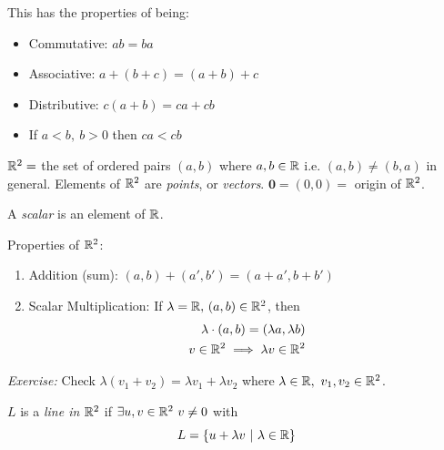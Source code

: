 \documentclass[10pt]{scrartcl}
\begin{document}
 
 
  This has the properties of being:\begin{itemize}
\item Commutative: $ab = ba$
\item Associative: $a+(b+c) = (a+b) + c	$
\item Distributive: $c(a+b) = ca + cb$
\item If $a<b,~b>0$ then $ca < cb$
\end{itemize}\vspace*{10pt}

\begin{definition}$\mathbb{R}^2 = $ the set of ordered pairs $(a,b)$ where $a,b \in \mathbb{R}$ i.e. $(a,b) \neq (b,a)$ in general. Elements of $\mathbb{R}^2$ are \emph{points}, or \emph{vectors}. $\mathbf{0} = (0,0) = $ origin of $\mathbb{R}^2$.

 A \emph{scalar} is an element of $\mathbb{R}$.	
\end{definition}


Properties of $\mathbb{R}^2$:\begin{enumerate}
\item Addition (sum): $(a,b) + (a',b') = (a+a',b+b')$
\begin{center}
\end{center}
\item Scalar Multiplication: If $\lambda = \mathbb{R},\, (a,b) \in \mathbb{R}^2$, then \begin{align*}\lambda \cdot (a,b) = (\lambda a,\lambda b)\\  v \in \mathbb{R}^2 \implies \lambda v \in \mathbb{R}^2\end{align*}
\end{enumerate}
\textit{Exercise:} Check $\lambda(v_1+v_2) = \lambda v_1 + \lambda v_2$ where $\lambda \in \mathbb{R},~ v_1,v_2 \in \mathbb{R}^2$. 

\vspace*{5pt}

\begin{definition}
 $L$ is a \emph{line in $\mathbb{R}^2$} if $\exists u, v \in \mathbb{R}^2~ v \neq 0$ with \[L = \{u + \lambda v ~|~ \lambda \in \mathbb{R}\}\]
 \end{definition}
 
\end{document}
